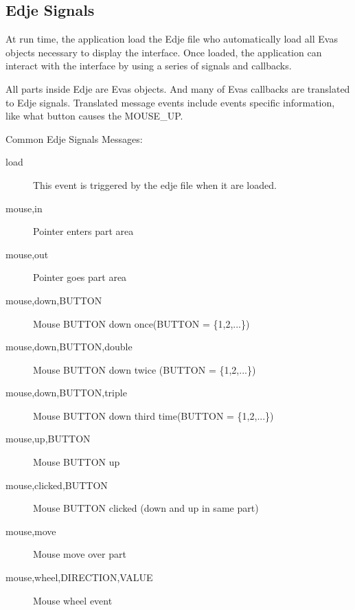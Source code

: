 \documentclass[a4paper]{profusion}
\begin{document}
\subsection{Edje Signals}

At run time, the application load the Edje file who automatically load
all Evas objects necessary to display the interface. Once loaded, the
application can interact with the interface by using a series of
signals and callbacks.

All parts inside Edje are Evas objects. And many of Evas callbacks are
translated to Edje signals. Translated message events include events
specific information, like what button causes the MOUSE\_UP.

Common Edje Signals Messages:
\begin{description}
 \item[load] This event is triggered by the edje file when it are
   loaded.

 \item[mouse,in] Pointer enters part area
 \item[mouse,out] Pointer goes part area
 \item[mouse,down,BUTTON] Mouse BUTTON down once(BUTTON = \{1,2,...\})
 \item[mouse,down,BUTTON,double] Mouse BUTTON down twice (BUTTON =
   \{1,2,...\})
 \item[mouse,down,BUTTON,triple] Mouse BUTTON down third time(BUTTON =
   \{1,2,...\})
 \item[mouse,up,BUTTON] Mouse BUTTON up
 \item[mouse,clicked,BUTTON] Mouse BUTTON clicked (down and up in same
   part)
 \item[mouse,move] Mouse move over part
 \item[mouse,wheel,DIRECTION,VALUE] Mouse wheel event




\end{description}
\end{document}
